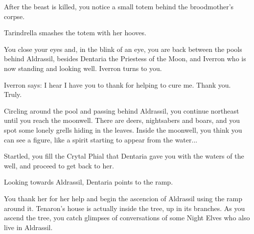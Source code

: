 
After the beast is killed, you notice a small totem behind the broodmother's corpse.



Tarindrella smashes the totem with her hooves.


You close your eyes and, in the blink of an eye, you are back between the pools behind Aldrassil, besides Dentaria the Priestess of the Moon, and Iverron who is now standing and looking well. Iverron turns to you.


Iverron says: I hear I have you to thank for helping to cure me. Thank you. Truly.



Circling around the pool and passing behind Aldrassil, you continue northeast until you reach the moonwell. There are deers, nightsabers and boars, and you spot some lonely grells hiding in the leaves. Inside the moonwell, you think you can see a figure, like a spirit starting to appear from the water...


Startled, you fill the Crytal Phial that Dentaria gave you with the waters of the well, and proceed to get back to her.




Looking towards Aldrassil, Dentaria points to the ramp.


You thank her for her help and begin the ascencion of Aldrassil using the ramp around it. Tenaron's house is actually inside the tree, up in its branches. As you ascend the tree, you catch glimpses of conversations of some Night Elves who also live in Aldrassil.


